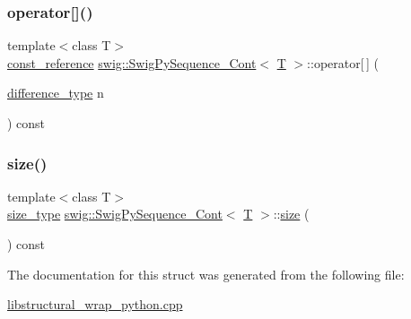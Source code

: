 \subsubsection{\texorpdfstring{operator[]()}{operator[]()}\hspace{0.1cm}{\footnotesize\ttfamily [2/2]}}
{\footnotesize\ttfamily template$<$class T$>$ \\
\hyperlink{structswig_1_1_swig_py_sequence___cont_a9c8d1d3acc0234f3a9cbd570ee7e9cf0}{const\+\_\+reference} \hyperlink{structswig_1_1_swig_py_sequence___cont}{swig\+::\+Swig\+Py\+Sequence\+\_\+\+Cont}$<$ \hyperlink{fmt_8h_a0acb682b8260ab1c60b918599864e2e5}{T} $>$\+::operator\mbox{[}$\,$\mbox{]} (\begin{DoxyParamCaption}\item[{\hyperlink{structswig_1_1_swig_py_sequence___cont_a016875541fce2f04f396da8057a190f9}{difference\+\_\+type}}]{n }\end{DoxyParamCaption}) const\hspace{0.3cm}{\ttfamily [inline]}}

\mbox{\label{structswig_1_1_swig_py_sequence___cont_a8c2d41c6dd056c7fa40a3c4606147e6b}} 
\subsubsection{\texorpdfstring{size()}{size()}}
{\footnotesize\ttfamily template$<$class T$>$ \\
\hyperlink{structswig_1_1_swig_py_sequence___cont_a53e4b21ab9cdd6d0e562ef8a0923cabb}{size\+\_\+type} \hyperlink{structswig_1_1_swig_py_sequence___cont}{swig\+::\+Swig\+Py\+Sequence\+\_\+\+Cont}$<$ \hyperlink{fmt_8h_a0acb682b8260ab1c60b918599864e2e5}{T} $>$\+::\hyperlink{ioapi_8h_a3728291d90c8c81bb270d14427a775d7}{size} (\begin{DoxyParamCaption}{ }\end{DoxyParamCaption}) const\hspace{0.3cm}{\ttfamily [inline]}}



The documentation for this struct was generated from the following file\+:\begin{DoxyCompactItemize}
\item 
\hyperlink{libstructural__wrap__python_8cpp}{libstructural\+\_\+wrap\+\_\+python.\+cpp}\end{DoxyCompactItemize}
